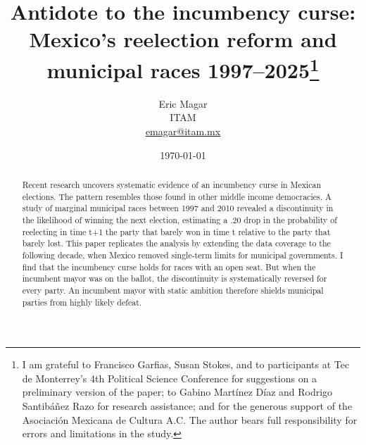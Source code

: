 \documentclass[letter,12pt]{article}
\begin{document}
\title{Antidote to the incumbency curse: \\ Mexico's reelection reform and municipal races 1997--2025\thanks{I am grateful to Francisco Garfias, Susan Stokes, and to participants at Tec de Monterrey's 4th Political Science Conference for suggestions on a preliminary version of the paper; to Gabino Martínez Díaz and Rodrigo Santibáñez Razo for research assistance; and for the generous support of the Asociación Mexicana de Cultura A.C. The author bears full responsibility for errors and limitations in the study.}}
\author{Eric Magar  \\ ITAM \\ \url{emagar@itam.mx}}
\date{\today}
\maketitle


\begin{abstract}
\noindent Recent research uncovers systematic evidence of an incumbency curse in Mexican elections. The pattern resembles those found in other middle income democracies. A study of marginal municipal races between 1997 and 2010 revealed a discontinuity in the likelihood of winning the next election, estimating a .20 drop in the probability of reelecting in time t+1 the party that barely won in time t relative to the party that barely lost. This paper replicates the analysis by extending the data coverage to the following decade, when Mexico removed single-term limits for municipal governments. I find that the incumbency curse holds for races with an open seat. But when the incumbent mayor was on the ballot, the discontinuity is systematically reversed for every party. An incumbent mayor with static ambition therefore shields municipal parties from highly likely defeat.
\end{abstract}

  
\end{document}
